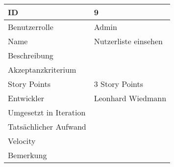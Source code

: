 \begin{tabularx}{\textwidth}{|p{}|X|}
	\hline
	ID & 9\\
	\hline
	Benutzerrolle & Admin\\
	\hline
	Name & Nutzerliste einsehen\\
	\hline
	Beschreibung & \\
	\hline
	Akzeptanzkriterium & \\
	\hline
	Story Points & 3 Story Points\\
	\hline
	Entwickler & Leonhard Wiedmann\\
	\hline
	Umgesetzt in Iteration & \\
	\hline
	Tatsächlicher Aufwand & \\
	\hline
	Velocity & \\
	\hline
	Bemerkung & \\
	\hline
\end{tabularx}
\vspace{20pt}
